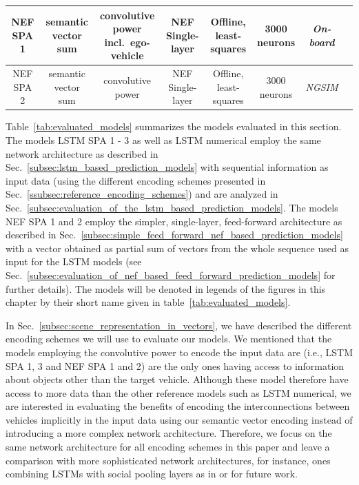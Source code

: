 \begin{center}
{\begin{tabular}{cccccccc}
            \midrule
            \acs{NEF} \acs{SPA} \num{1} & semantic vector sum & \makecell{convolutive power \\ incl.\ ego-vehicle} & \acs{NEF} Single-layer & \makecell{Offline, \\ least-squares} & \num{3000} neurons  &\emph{On-board} \\ 
            \midrule
            \acs{NEF} \acs{SPA} \num{2} & semantic vector sum & convolutive power & \acs{NEF} Single-layer & \makecell{Offline, \\ least-squares} & \num{3000} neurons &\emph{\ac{NGSIM}}\\ 
            \bottomrule
        \end{tabular}
    }
	\label{tab:evaluated_models}
\end{center}

Table~\ref{tab:evaluated_models} summarizes the models evaluated in this section.
The models \ac{LSTM} \ac{SPA} \num{1} - \num{3} as well as \ac{LSTM} numerical employ the same network architecture as described in Sec.~\ref{subsec:lstm_based_prediction_models} with sequential information as input data (using the different encoding schemes presented in Sec.~\ref{ssubsec:reference_encoding_schemes}) and are analyzed in Sec.~\ref{subsec:evaluation_of_the_lstm_based_prediction_models}.
The models \ac{NEF} \ac{SPA} \num{1} and \num{2} employ the simpler, single-layer, feed-forward architecture as described in Sec.~\ref{subsec:simple_feed_forward_nef_based_prediction_models} with a vector obtained as partial sum of vectors from the whole sequence used as input for the \ac{LSTM} models (see Sec.~\ref{subsec:evaluation_of_nef_based_feed_forward_prediction_models} for further details).
The models will be denoted in legends of the figures in this chapter by their short name given in table~\ref{tab:evaluated_models}.

In Sec.~\ref{subsec:scene_representation_in_vectors}, we have described the different encoding schemes we will use to evaluate our models.
We mentioned that the models employing the convolutive power to encode the input data are (i.e., \ac{LSTM} \ac{SPA} \num{1}, \num{3} and \ac{NEF} \ac{SPA} \num{1} and \num{2}) are the only ones having access to information about objects other than the target vehicle.
Although these model therefore have access to more data than the other reference models such as \ac{LSTM} numerical, we are interested in evaluating the benefits of encoding the interconnections between vehicles implicitly in the input data using our semantic vector encoding instead of introducing a more complex network architecture.
Therefore, we focus on the same network architecture for all encoding schemes in this paper and leave a comparison with more sophisticated network architectures, for instance, ones combining \acp{LSTM} with social pooling layers as in \textcite{Deo2018a} or \textcite{Alahi2016} for future work.

